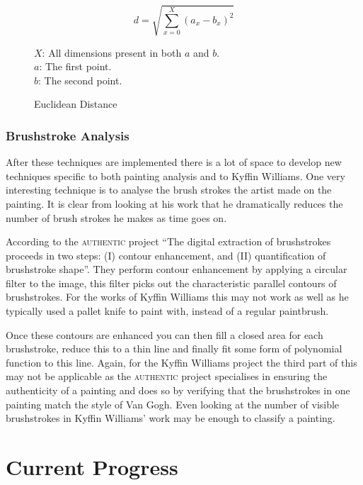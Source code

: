 \documentclass[11pt,fleqn,twoside]{article}
\begin{document}
\begin{figure}[p]
\[
d = \sqrt{\sum^X_{x=0}{(a_x - b_x)^2}}
\]

\(X\): All dimensions present in both \(a\) and \(b\).\\
\(a\): The first point.\\
\(b\): The second point.
\caption{Euclidean Distance}
\label{eq:euclidean}
\end{figure}

\subsubsection{Brushstroke Analysis}
After these techniques are implemented there is a lot of space to develop new techniques specific 
to both painting analysis and to Kyffin Williams. One very interesting technique is to analyse the
brush strokes the artist made on the painting. It is clear from looking at his work that he 
dramatically reduces the number of brush strokes he makes as time goes on. 

According to the \textsc{authentic} project ``The digital extraction of brushstrokes proceeds in 
two steps: (I) contour enhancement, and (II) quantification of brushstroke 
shape''\cite{citeulike:11446581}. They perform contour enhancement by applying a circular filter to
the image, this filter picks out the characteristic parallel contours of brushstrokes. For the 
works of Kyffin Williams this may not work as well as he typically used a pallet knife %
to paint with, instead of a regular paintbrush.

Once these contours are enhanced you can then fill a closed area for each brushstroke, reduce this 
to a thin line and finally fit some form of polynomial function to this line. Again, for the Kyffin
Williams project the third part of this may not be applicable as the \textsc{authentic} project
specialises in ensuring the authenticity of a painting and does so by verifying that the 
brushstrokes in one painting match the style of Van Gogh. Even looking at the number of visible
brushstrokes in Kyffin Williams' work may be enough to classify a painting.



\section{Current Progress}
\end{document}
